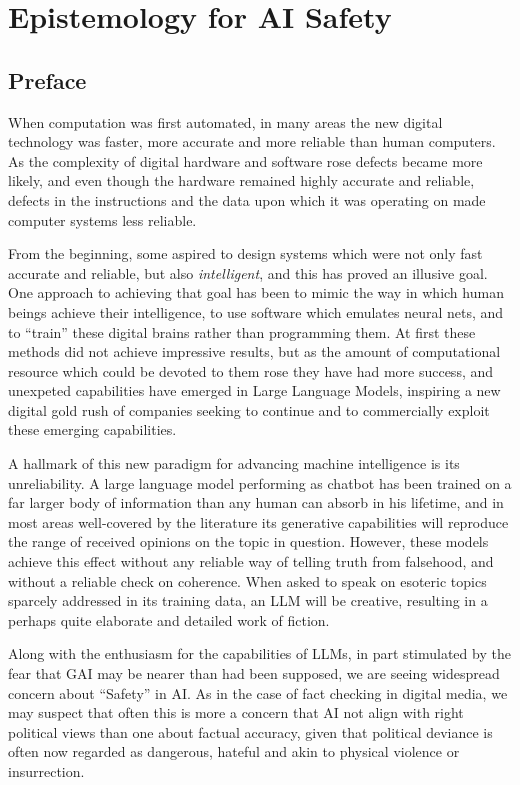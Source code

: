 \documentclass[10pt,titlepage]{book}
\begin{document}
\cite{murray2019evolutionary}


\chapter{Epistemology for AI Safety}

\section{Preface}

When computation was first automated, in many areas the new digital technology was faster, more accurate and more reliable than human computers.
As the complexity of digital hardware and software rose defects became more likely, and even though the hardware remained highly accurate and reliable, defects in the instructions and the data upon which it was operating on made computer systems less reliable.

From the beginning, some aspired to design systems which were not only fast accurate and reliable, but also \emph{intelligent}, and this has proved an illusive goal.
One approach to achieving that goal has been to mimic the way in which human beings achieve their intelligence, to use software which emulates neural nets, and to ``train'' these digital brains rather than programming them.
At first these methods did not achieve impressive results, but as the amount of computational resource which could be devoted to them rose they have had more success, and unexpeted capabilities have emerged in Large Language Models, inspiring a new digital gold rush of companies seeking to continue and to commercially exploit these emerging capabilities.

A hallmark of this new paradigm for advancing machine intelligence is its unreliability.
A large language model performing as chatbot has been trained on a far larger body of information than any human can absorb in his lifetime, and in most areas well-covered by the literature its generative capabilities will reproduce the range of received opinions on the topic in question.
However, these models achieve this effect without any reliable way of telling truth from falsehood, and without a reliable check on coherence.
When asked to speak on esoteric topics sparcely addressed in its training data, an LLM will be creative, resulting in a perhaps quite elaborate and detailed work of fiction.

Along with the enthusiasm for the capabilities of LLMs, in part stimulated by the fear that GAI may be nearer than had been supposed, we are seeing widespread concern about ``Safety'' in AI.
As in the case of fact checking in digital media, we may suspect that often this is more a concern that AI not align with right political views than one about factual accuracy, given that political deviance is often now regarded as dangerous, hateful and akin to physical violence or insurrection.
\end{document}
